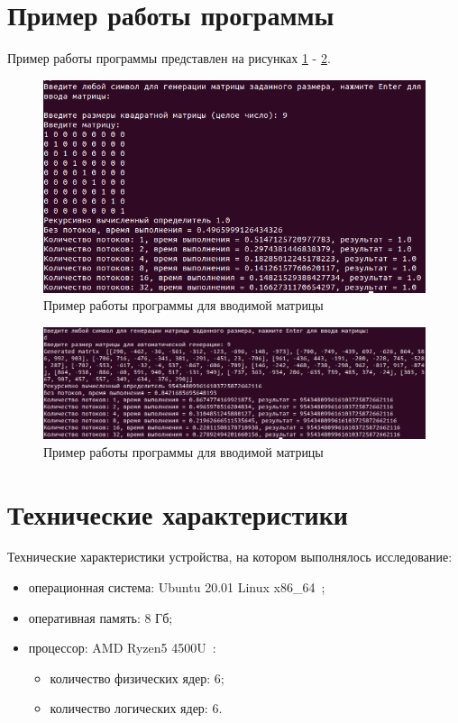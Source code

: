 \documentclass[a4paper,oneside,14pt]{extreport}
\begin{document}
\section{Пример работы программы}
Пример работы программы представлен на рисунках \ref{fig:input_mat_ex} - \ref{fig:gener_ex}.
\captionsetup{singlelinecheck=true}
\begin{figure}[H]
	\centering
	\includegraphics[width=1\linewidth]{images/input_mat_ex}
	\caption{Пример работы программы для вводимой матрицы}
	\label{fig:input_mat_ex}
\end{figure}

\begin{figure}[H]
	\centering
	\includegraphics[width=1\linewidth]{images/generate_ex}
	\caption{Пример работы программы для вводимой матрицы}
	\label{fig:gener_ex}
\end{figure}


\section{Технические характеристики}
Технические характеристики устройства, на котором выполнялось исследование:
\begin{itemize}
	\item операционная система: Ubuntu 20.01 Linux x86\_64~\cite{ubuntu};
	\item оперативная память: 8 Гб;
	\item процессор: AMD Ryzen5 4500U~\cite{processor}:
	\begin{itemize}
		\item количество физических ядер: 6;
		\item количество логических ядер: 6.
	\end{itemize}
\end{itemize}
\end{document}

